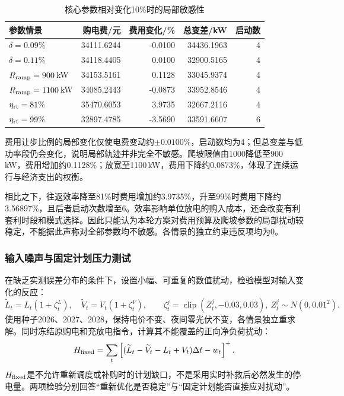 \documentclass[withoutpreface,bwprint]{cumcmthesis}
\begin{document}
\begin{table}[htbp]
 \centering\small
 \caption{核心参数相对变化10\%时的局部敏感性}\label{tab:q1-robust}
 \begin{tabular}{lrrrr}
 \toprule
 参数情景&购电费/元&费用变化/\%&总变差/kW&启动数\\
 \midrule
$\delta=0.09\%$&34111.6244&-0.0100&34436.1963&4\\
$\delta=0.11\%$&34118.4405&0.0100&32900.5165&4\\
$R_{\rm ramp}=900$\,kW&34153.5161&0.1128&33045.9374&4\\
$R_{\rm ramp}=1100$\,kW&34085.2443&-0.0873&33952.8546&4\\
$\eta_{\rm rt}=81\%$&35470.6053&3.9735&32667.2116&4\\
$\eta_{\rm rt}=99\%$&32897.4785&-3.5690&33591.6607&6\\
 \bottomrule
 \end{tabular}
\end{table}

费用让步比例的局部变化仅使电费变动约$\pm0.0100\%$，启动数均为4；但总变差与低功率段仍会变化，说明局部轨迹并非完全不敏感。爬坡限值由1000降低至900\,kW，费用增加约0.1128\%；放宽至1100\,kW，费用下降约0.0873\%，体现了连续运行与经济支出的权衡。

相比之下，往返效率降至81\%时费用增加约3.9735\%，升至99\%时费用下降约3.56897\%，且后者启动次数增至6。效率影响单位放电的购入成本，还会改变有利套利时段和模式选择。因此只能认为本轮方案对费用预算及爬坡参数的局部扰动较稳定，不能据此声称对全部参数均不敏感。各情景的独立约束违反项均为0。

\subsubsection{输入噪声与固定计划压力测试}
在缺乏实测误差分布的条件下，设置小幅、可重复的数值扰动，检验模型对输入变化的反应：
\begin{equation}
 \widetilde L_t=L_t(1+\zeta_t^L),\quad
 \widetilde V_t=V_t(1+\zeta_t^V),\qquad
 \zeta_t^j=\operatorname{clip}(Z_t^j,-0.03,0.03),\
 Z_t^j\sim N(0,0.01^2).
 \label{eq:q1-noise}
\end{equation}
使用种子2026、2027、2028，保持电价不变、夜间零光伏不变，各情景独立重求解。同时冻结原购电和充放电指令，计算其不能覆盖的正向净负荷扰动：
\begin{equation}
 H_{\rm fixed}
 =\sum_t\left[
  (\widetilde L_t-\widetilde V_t-L_t+V_t)\Delta t-w_t
 \right]^+ .
 \label{eq:q1-fixed-test}
\end{equation}
$H_{\rm fixed}$是不允许重新调度或补购时的计划缺口，不是采用实时补救后必然发生的停电量。两项检验分别回答“重新优化是否稳定”与“固定计划能否直接应对扰动”。
\end{document}
